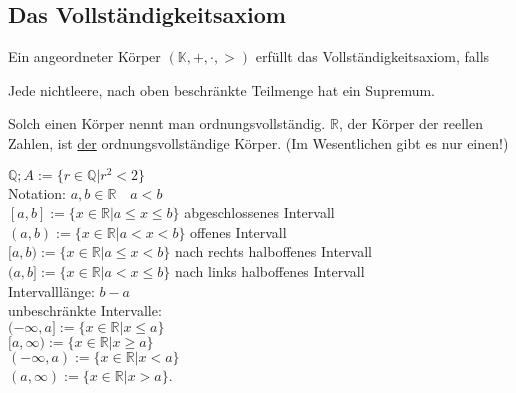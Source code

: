 \documentclass[../ana1.tex]{subfiles}
\begin{document}
				\subsection{Das Vollständigkeitsaxiom}
				\begin{defi}
					Ein angeordneter Körper $(\mathbb{K},+,\cdot,>)$ erfüllt das Vollständigkeitsaxiom, falls\\
					\begin{center}
						Jede nichtleere, nach oben beschränkte Teilmenge hat ein Supremum.
					\end{center}
					Solch einen Körper nennt man ordnungsvollständig. $\mathbb{R}$, der Körper der reellen Zahlen, ist \underline{der} ordnungsvollständige Körper. (Im Wesentlichen gibt es nur einen!)
				\end{defi}
			$\mathbb{Q}; A:= \{r\in\mathbb{Q}|r^2 < 2\}$\\
				Notation: $a,b\in\mathbb{R} \quad a<b$\\
			$[a,b] := \{x\in\mathbb{R}|a\leq x\leq b\}$ abgeschlossenes Intervall\\
			$(a,b) := \{x\in\mathbb{R} | a<x<b\}$ offenes Intervall\\
			$[a,b) := \{x\in\mathbb{R}|a\leq x<b\}$ nach rechts halboffenes Intervall\\
					$(a,b] := \{x\in\mathbb{R}|a<x\leq b\}$ nach links halboffenes Intervall\\
				Intervalllänge: $b-a$\\
				unbeschränkte Intervalle:\\
			$(-\infty, a] := \{x\in\mathbb{R}|x\leq a\}$\\
$[a,\infty) := \{x\in\mathbb{R}|x\geq a\}$\\
$(-\infty, a) := \{x\in\mathbb{R}|x<a\}$\\
$(a, \infty) := \{x\in\mathbb{R}|x>a\}$.
\end{document}
